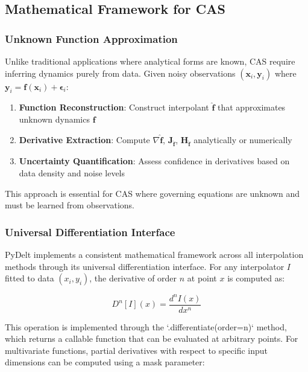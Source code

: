 \documentclass[10pt,journal,compsoc]{IEEEtran}
\begin{document}
\subsection{Mathematical Framework for CAS}

\subsubsection{Unknown Function Approximation}

Unlike traditional applications where analytical forms are known, CAS require inferring dynamics purely from data. Given noisy observations $(\mathbf{x}_i, \mathbf{y}_i)$ where $\mathbf{y}_i = \mathbf{f}(\mathbf{x}_i) + \boldsymbol{\epsilon}_i$:

\begin{enumerate}
    \item \textbf{Function Reconstruction}: Construct interpolant $\hat{\mathbf{f}}$ that approximates unknown dynamics $\mathbf{f}$
    \item \textbf{Derivative Extraction}: Compute $\nabla \hat{\mathbf{f}}$, $\mathbf{J}_{\hat{\mathbf{f}}}$, $\mathbf{H}_{\hat{\mathbf{f}}}$ analytically or numerically
    \item \textbf{Uncertainty Quantification}: Assess confidence in derivatives based on data density and noise levels
\end{enumerate}

This approach is essential for CAS where governing equations are unknown and must be learned from observations.

\subsubsection{Universal Differentiation Interface}

PyDelt implements a consistent mathematical framework across all interpolation methods through its universal differentiation interface. For any interpolator $I$ fitted to data $(x_i, y_i)$, the derivative of order $n$ at point $x$ is computed as:

\begin{equation}
    D^n[I](x) = \frac{d^n I(x)}{dx^n}
\end{equation}

This operation is implemented through the `.differentiate(order=n)` method, which returns a callable function that can be evaluated at arbitrary points. For multivariate functions, partial derivatives with respect to specific input dimensions can be computed using a mask parameter:
\end{document}
